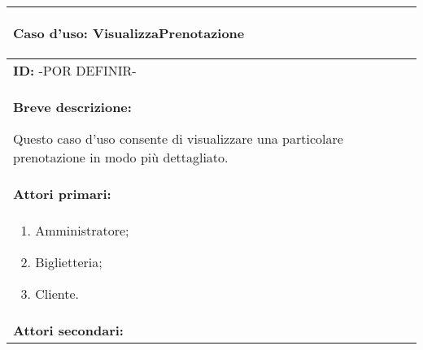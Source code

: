 \documentclass{article}
\begin{document}
\begin{table}[t]
    \centering
    \begin{tabular}{|p{\linewidth}|}
        \hline
        \cellcolor{gray!100}
        \color{white}
        \begin{center}
            \textbf{Caso d'uso:} VisualizzaPrenotazione
        \end{center} \\
        \hline
        \textbf{ID:} -POR DEFINIR- \\
        \hline
        \cellcolor{gray!20}
        \textbf{Breve descrizione:}

        Questo caso d'uso consente di visualizzare una particolare prenotazione in modo più dettagliato. \\
        \hline
        \textbf{Attori primari:} \\
        \begin{minipage}{\linewidth}
            \begin{enumerate}[noitemsep]
                \item Amministratore;
                \item Biglietteria;
                \item Cliente.
            \end{enumerate}
        \end{minipage}
        \vspace{0pt} \\
        \hline
        \textbf{Attori secondari:}


\end{tabular}
\end{table}
\end{document}

